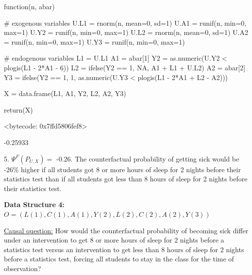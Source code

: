 \documentclass[answers]{exam}
\begin{document}
\begin{solution}
\begin{Schunk}
\begin{Soutput}
function(n, abar) {
  
  # exogenous variables
  U.L1 = rnorm(n, mean=0, sd=1)
  U.A1 = runif(n, min=0, max=1)
  U.Y2 = runif(n, min=0, max=1)
  U.L2 = rnorm(n, mean=0, sd=1)
  U.A2 = runif(n, min=0, max=1)
  U.Y3 = runif(n, min=0, max=1)
  
  # endogenous variables
  L1 = U.L1
  A1 = abar[1]
  Y2 = as.numeric(U.Y2 < plogis(L1 - 2*A1 - 6))
  L2 = ifelse(Y2 == 1, NA, A1 + L1 + U.L2)
  A2 = abar[2]
  Y3 = ifelse(Y2 == 1, 1, as.numeric(U.Y3 < plogis(L1 - 2*A1 + L2 - A2)))
  
  X = data.frame(L1, A1, Y2, L2, A2, Y3)
  
  return(X)
  
}
<bytecode: 0x7ffd5806fef8>
\end{Soutput}
\end{Schunk}

\begin{Schunk}
\begin{Soutput}
[1] -0.25933
\end{Soutput}
\end{Schunk}


5. $\Psi^F(P_{U,X}) = $ -0.26. The counterfactual probability of getting sick would be -26\% higher if all students got 8 or more hours of sleep for 2 nights before their statistics test than if all students got less than 8 hours of sleep for 2 nights before their statistics test.



\end{solution}


\pagebreak

\noindent\large\textbf{Data Structure 4: $O = (L(1), C(1), A(1), Y(2), L(2), C(2), A(2), Y(3))$}
\normalsize

\noindent\underline{Causal question:} How would the counterfactual probability of becoming sick differ under an intervention to get 8 or more hours of sleep for 2 nights before a statistics test versus an intervention to get less than 8 hours of sleep for 2 nights before a statistics test, forcing all students to stay in the class for the time of observation?
\end{document}
